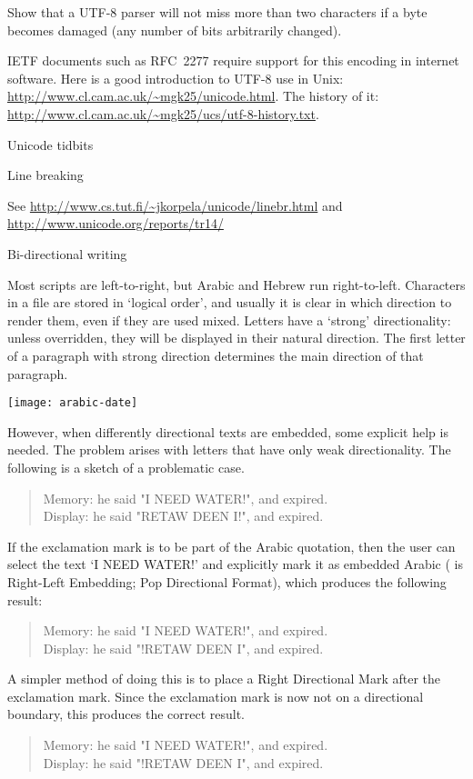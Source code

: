 \begin{594exercise}
Show that a UTF-8 parser will not miss more than two characters
if a byte becomes damaged (any number of bits arbitrarily changed).
\end{594exercise}

IETF documents such as
RFC~2277 require support for this encoding in internet
software. Here is a good introduction to UTF-8 use in Unix:
\url{http://www.cl.cam.ac.uk/~mgk25/unicode.html}. The history of
it: \url{http://www.cl.cam.ac.uk/~mgk25/ucs/utf-8-history.txt}.

 {Unicode tidbits}

 {Line breaking}

See
\url{http://www.cs.tut.fi/~jkorpela/unicode/linebr.html} and
\url{http://www.unicode.org/reports/tr14/}

 {Bi-directional writing}

Most scripts are left-to-right, but Arabic and Hebrew run
right-to-left. Characters in a file are stored in `logical order', and
usually it is clear in which direction to render them, even if they
are used mixed. Letters have a `strong' directionality: unless
overridden, they will be displayed in their natural direction. The
first letter of a paragraph with strong direction determines the main
direction of that paragraph.

\texttt{[image: arabic-date]}

However, when differently directional texts are
embedded, some explicit help is needed. The problem arises with
letters that have only weak directionality. The following is a sketch
of a problematic case.
\begin{quote}
Memory:  he said "I NEED WATER!", and expired.\\
Display: he said "RETAW DEEN I!", and expired.
\end{quote}
If the exclamation mark is to be part of the Arabic quotation, then
the user can select the text `I NEED WATER!' and explicitly mark it as
embedded Arabic ( is Right-Left Embedding;  Pop
Directional Format), which produces the following result:
\begin{quote}
Memory:  he said "I NEED WATER!", and expired.\\
Display: he said "!RETAW DEEN I", and expired.
\end{quote}
A simpler method of doing this is to place a Right Directional Mark
 after the exclamation mark. Since the exclamation mark is now
not on a directional boundary, this produces the correct result.
\begin{quote}
Memory:  he said "I NEED WATER!", and expired.\\
Display: he said "!RETAW DEEN I", and expired.
\end{quote}

